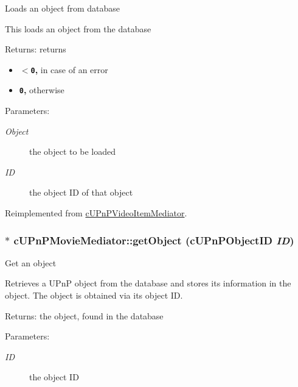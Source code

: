 Loads an object from database

This loads an object from the database

\begin{Desc}
\item[Returns:]returns\begin{itemize}
\item {\bf {\tt $<$0},} in case of an error\item {\bf {\tt 0},} otherwise \end{itemize}
\end{Desc}
\begin{Desc}
\item[Parameters:]
\begin{description}
\item[{\em Object}]the object to be loaded \item[{\em ID}]the object ID of that object \end{description}
\end{Desc}
 

Reimplemented from \hyperlink{classcUPnPVideoItemMediator_3f7ec1937b2b95e3ec5462470971d350}{cUPnPVideoItemMediator}.\hypertarget{classcUPnPMovieMediator_d85b240eb54efd9ab46c440b51c71e83}{
\subsubsection[{getObject}]{ $\ast$ cUPnPMovieMediator::getObject ({\bf cUPnPObjectID} {\em ID})}}
\label{classcUPnPMovieMediator_d85b240eb54efd9ab46c440b51c71e83}


Get an object

Retrieves a UPnP object from the database and stores its information in the object. The object is obtained via its object ID.

\begin{Desc}
\item[Returns:]the object, found in the database \end{Desc}
\begin{Desc}
\item[Parameters:]
\begin{description}
\item[{\em ID}]the object ID \end{description}
\end{Desc}
  

